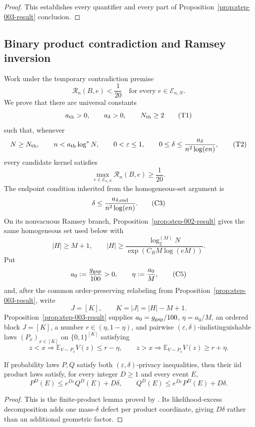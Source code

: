 \begin{proof}
This establishes every quantifier and every part of Proposition~\ref{prop:step-003-result} conclusion.

\end{proof}

\subsection{Binary product contradiction and Ramsey inversion}
\label{app:step-004}

Work under the temporary contradiction premise
\[
\mathcal R_n(B,e)<\frac1{20}
\quad\text{for every }e\in\mathcal E_{n,N}.
\tag{A1}\label{eq:step-004-a1}
\]
We prove that there are universal constants
\[
a_{\rm th}>0,\qquad a_\delta>0,\qquad N_{\rm th}\geq2
\tag{T1}\label{eq:step-004-t1}
\]
such that, whenever
\[
N\geq N_{\rm th},\qquad
n<a_{\rm th}\log^*N,\qquad
0<\varepsilon\leq1,\qquad
0\leq\delta\leq\frac{a_\delta}{n^2\log(en)},
\tag{T2}\label{eq:step-004-t2}
\]
every candidate kernel satisfies
\[
\max_{e\in\mathcal E_{n,N}}\mathcal R_n(B,e)\geq\frac1{20}.
\tag{T3}\label{eq:step-004-t3}
\]
The endpoint condition inherited from the homogeneous-set argument is
\[
\delta\leq
\frac{a_{\delta,{\rm end}}}{n^2\log(en)}.
\tag{C3}\label{eq:step-004-c3}
\]
On its nonvacuous Ramsey branch, Proposition~\ref{prop:step-002-result}
gives the same homogeneous set used below with
\[
|H|\geq M+1,
\qquad
|H|\geq
\frac{\log_2^{(M)}N}{\exp(C_RM\log(eM))}.
\tag{C4}\label{eq:step-004-c4}
\]
Put
\[
a_0:=\frac{g_{\rm gap}}{100}>0,
\qquad
\eta:=\frac{a_0}{M},
\tag{C5}\label{eq:step-004-c5}
\]
and, after the common order-preserving relabeling from
Proposition~\ref{prop:step-003-result}, write
\[
J=[K],\qquad K=|J|=|H|-M+1.
\tag{C6}\label{eq:step-004-c6}
\]
Proposition~\ref{prop:step-003-result} supplies
$a_0=g_{\rm gap}/100$, $\eta=a_0/M$, an ordered block
$J=[K]$, a number $r\in(\eta,1-\eta)$, and pairwise
$(\varepsilon,\delta)$-indistinguishable laws $(P_x)_{x\in[K]}$ on
$\{0,1\}^{[K]}$ satisfying
\[
z<x\Longrightarrow\mathbb E_{V\sim P_x}V(z)\leq r-\eta,
\qquad
z>x\Longrightarrow\mathbb E_{V\sim P_x}V(z)\geq r+\eta.
\tag{C7}\label{eq:step-004-c7}
\]

\begin{lemma}
\label{lem:product-privacy}
If probability laws $P,Q$ satisfy both
$(\varepsilon,\delta)$-privacy inequalities, then their iid product laws
satisfy, for every integer $D\geq1$ and every event $E$,
\[
P^D(E)\leq e^{D\varepsilon}Q^D(E)+D\delta,
\qquad
Q^D(E)\leq e^{D\varepsilon}P^D(E)+D\delta.
\tag{C8}\label{eq:step-004-c8}
\]
\end{lemma}
\begin{proof}
This is the finite-product lemma proved by
\citet{alonEtAl2018private}.  Its likelihood-excess decomposition adds
one mass-$\delta$ defect per product coordinate, giving $D\delta$ rather
than an additional geometric factor.
\end{proof}

